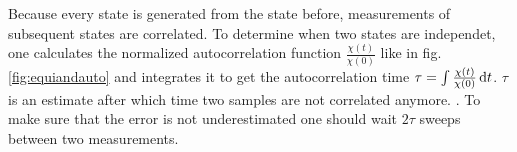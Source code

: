     Because every state is generated from the state before, measurements
    of subsequent states are correlated. To determine when two states
    are independet, one calculates the normalized autocorrelation function
    \(\frac{\chi(t)}{\chi(0)}\) like in fig. \ref{fig:equiandauto}
    and integrates it to get the autocorrelation time \(\tau = \int \frac{\chi(t)}{\chi(0)} \,\mathrm{d} t\).
    \(\tau\) is an estimate after which time two samples are not
    correlated anymore. \cite[S. ??]{NewmanBarkema1999} \cite[S. 150f]{Katzgraber2011}.
    To make sure that the error is not underestimated one should wait
    \(2\tau\) sweeps between two measurements.


